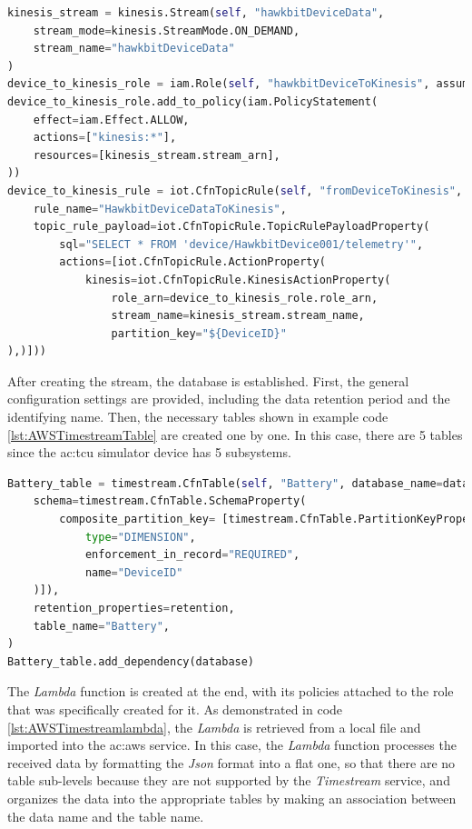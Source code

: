 \begin{lstlisting}[language=Python, caption={\textit{CDK} code for the creation of the \textit{Kinesis} stream with its role and rule}, label=lst:AWSKinesis]
kinesis_stream = kinesis.Stream(self, "hawkbitDeviceData",
    stream_mode=kinesis.StreamMode.ON_DEMAND,
    stream_name="hawkbitDeviceData"
)
device_to_kinesis_role = iam.Role(self, "hawkbitDeviceToKinesis", assumed_by=iam.ServicePrincipal("iot.amazonaws.com"),  role_name="hawkbitDeviceToKinesis")
device_to_kinesis_role.add_to_policy(iam.PolicyStatement(
    effect=iam.Effect.ALLOW,
    actions=["kinesis:*"],
    resources=[kinesis_stream.stream_arn],
))
device_to_kinesis_rule = iot.CfnTopicRule(self, "fromDeviceToKinesis",
    rule_name="HawkbitDeviceDataToKinesis",
    topic_rule_payload=iot.CfnTopicRule.TopicRulePayloadProperty(
        sql="SELECT * FROM 'device/HawkbitDevice001/telemetry'",
        actions=[iot.CfnTopicRule.ActionProperty(
            kinesis=iot.CfnTopicRule.KinesisActionProperty(
                role_arn=device_to_kinesis_role.role_arn,
                stream_name=kinesis_stream.stream_name,
                partition_key="${DeviceID}"
),)]))
\end{lstlisting}
After creating the stream, the database is established. First, the general configuration settings are provided, including the data retention period and the identifying name. Then, the necessary tables shown in example code \ref{lst:AWSTimestreamTable} are created one by one. In this case, there are 5 tables since the \gls{ac:tcu} simulator device has 5 subsystems.
\begin{lstlisting}[language=Python, caption={\textit{CDK} code for the creation of the battery table of the \textit{Timestream} database}, label=lst:AWSTimestreamTable]
Battery_table = timestream.CfnTable(self, "Battery", database_name=database.database_name,
    schema=timestream.CfnTable.SchemaProperty(
        composite_partition_key= [timestream.CfnTable.PartitionKeyProperty(
            type="DIMENSION",
            enforcement_in_record="REQUIRED",
            name="DeviceID"
    )]),
    retention_properties=retention,
    table_name="Battery",
)
Battery_table.add_dependency(database)
\end{lstlisting}
The \textit{Lambda} function is created at the end, with its policies attached to the role that was specifically created for it. As demonstrated in code \ref{lst:AWSTimestreamlambda}, the \textit{Lambda} is retrieved from a local file and imported into the \gls{ac:aws} service. In this case, the \textit{Lambda} function processes the received data by formatting the \textit{Json} format into a flat one, so that there are no table sub-levels because they are not supported by the \textit{Timestream} service, and organizes the data into the appropriate tables by making an association between the data name and the table name.
